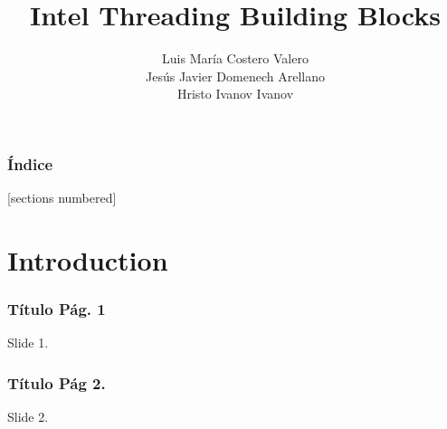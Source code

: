 \documentclass[10pt]{beamer}
\title{Intel Threading Building Blocks}
\date{}%
\author{Luis María Costero Valero\\Jesús Javier Domenech Arellano\\Hristo
  Ivanov Ivanov}
\institute{23 Noviembre 2015}
\begin{document}
\maketitle


\begin{frame}
  \frametitle{Índice}
  [sections numbered]
  \tableofcontents[hideallsubsections]
\end{frame}

\section{Introduction} %

\begin{frame}
  \frametitle{Título Pág. 1}
  Slide 1.
\end{frame}


\begin{frame}
  \frametitle{Título Pág 2.}
  Slide 2.
\end{frame}
\end{document}
